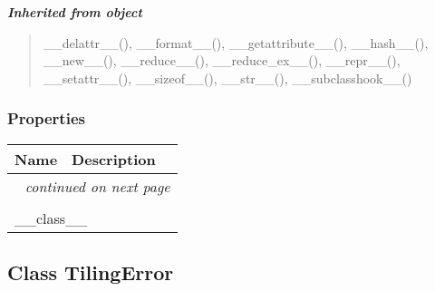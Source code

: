 \large{\textbf{\textit{Inherited from object}}}

\begin{quote}
\_\_delattr\_\_(), \_\_format\_\_(), \_\_getattribute\_\_(), \_\_hash\_\_(), \_\_new\_\_(), \_\_reduce\_\_(), \_\_reduce\_ex\_\_(), \_\_repr\_\_(), \_\_setattr\_\_(), \_\_sizeof\_\_(), \_\_str\_\_(), \_\_subclasshook\_\_()
\end{quote}


  \subsubsection{Properties}

    \vspace{-1cm}
\hspace{\varindent}\begin{longtable}{|p{\varnamewidth}|p{\vardescrwidth}|l}
\cline{1-2}
\cline{1-2} \centering \textbf{Name} & \centering \textbf{Description}& \\
\cline{1-2}
\endhead\cline{1-2}\multicolumn{3}{r}{\small\textit{continued on next page}}\\\endfoot\cline{1-2}
\endlastfoot\multicolumn{2}{|l|}{\textit{Inherited from object}}\\
\multicolumn{2}{|p{\varwidth}|}{\raggedright \_\_class\_\_}\\
\cline{1-2}
\end{longtable}



\subsection{Class TilingError}

